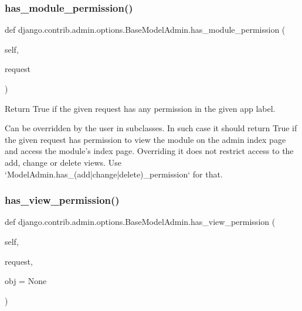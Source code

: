 \subsubsection{\texorpdfstring{has\+\_\+module\+\_\+permission()}{has\_module\_permission()}}
{\footnotesize\ttfamily def django.\+contrib.\+admin.\+options.\+Base\+Model\+Admin.\+has\+\_\+module\+\_\+permission (\begin{DoxyParamCaption}\item[{}]{self,  }\item[{}]{request }\end{DoxyParamCaption})}

\begin{DoxyVerb}Return True if the given request has any permission in the given
app label.

Can be overridden by the user in subclasses. In such case it should
return True if the given request has permission to view the module on
the admin index page and access the module's index page. Overriding it
does not restrict access to the add, change or delete views. Use
`ModelAdmin.has_(add|change|delete)_permission` for that.
\end{DoxyVerb}
 \mbox{\label{classdjango_1_1contrib_1_1admin_1_1options_1_1_base_model_admin_a6ea3f350aa50399449f511482df5cffb}} 
\subsubsection{\texorpdfstring{has\+\_\+view\+\_\+permission()}{has\_view\_permission()}}
{\footnotesize\ttfamily def django.\+contrib.\+admin.\+options.\+Base\+Model\+Admin.\+has\+\_\+view\+\_\+permission (\begin{DoxyParamCaption}\item[{}]{self,  }\item[{}]{request,  }\item[{}]{obj = {\ttfamily None} }\end{DoxyParamCaption})}


